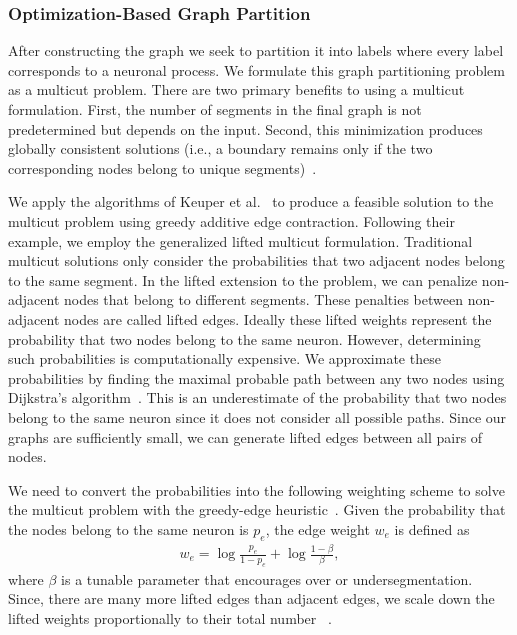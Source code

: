 \subsubsection{Optimization-Based Graph Partition}

\label{sec:optimization}

After constructing the graph we seek to partition it into labels where every label corresponds to a neuronal process. 
We formulate this graph partitioning problem as a multicut problem.
There are two primary benefits to using a multicut formulation. 
First, the number of segments in the final graph is not predetermined but depends on the input. 
Second, this minimization produces globally consistent solutions (i.e., a boundary remains only if the two corresponding nodes belong to unique segments)~\cite{keuper2015efficient}.

We apply the algorithms of Keuper et al.~\cite{keuper2015efficient} to produce a feasible solution to the multicut problem using greedy additive edge contraction.
Following their example, we employ the generalized lifted multicut formulation.
Traditional multicut solutions only consider the probabilities that two adjacent nodes belong to the same segment. 
In the lifted extension to the problem, we can penalize non-adjacent nodes that belong to different segments. 
These penalties between non-adjacent nodes are called lifted edges. 
Ideally these lifted weights represent the probability that two nodes belong to the same neuron.
However, determining such probabilities is computationally expensive.
We approximate these probabilities by finding the maximal probable path between any two nodes using Dijkstra's algorithm~\cite{keuper2015efficient}.
This is an underestimate of the probability that two nodes belong to the same neuron since it does not consider all possible paths.
Since our graphs are sufficiently small, we can generate lifted edges between all pairs of nodes. 

We need to convert the probabilities into the following weighting scheme to solve the multicut problem with the greedy-edge heuristic~\cite{andres2011probabilistic,keuper2015efficient}.
Given the probability that the nodes belong to the same neuron is $p_e$, the edge weight $w_e$ is defined as
\begin{align}
w_e = \log{\frac{p_e}{1 - p_e}} + \log{\frac{1 - \beta}{\beta}},
\end{align}
where $\beta$ is a tunable parameter that encourages over or undersegmentation. 
Since, there are many more lifted edges than adjacent edges, we scale down the lifted weights proportionally to their total number  
~\cite{beier2017multicut}.

